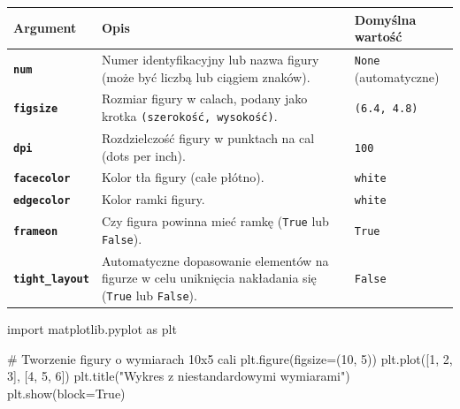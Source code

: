 \documentclass[
  polish,
  letterpaper,
  DIV=11,
  numbers=noendperiod]{scrreprt}
\newenvironment{Shaded}{\begin{snugshade}}{\end{snugshade}}
\newcommand{\CommentTok}[1]{\textcolor[rgb]{0.37,0.37,0.37}{#1}}
\newcommand{\DecValTok}[1]{\textcolor[rgb]{0.68,0.00,0.00}{#1}}
\newcommand{\ImportTok}[1]{\textcolor[rgb]{0.00,0.46,0.62}{#1}}
\newcommand{\NormalTok}[1]{\textcolor[rgb]{0.00,0.23,0.31}{#1}}
\newcommand{\OperatorTok}[1]{\textcolor[rgb]{0.37,0.37,0.37}{#1}}
\newcommand{\StringTok}[1]{\textcolor[rgb]{0.13,0.47,0.30}{#1}}
\newcommand{\VariableTok}[1]{\textcolor[rgb]{0.07,0.07,0.07}{#1}}
\newcounter{none} %
\begin{document}
{\def\LTcaptype{none} %
\begin{longtable}[]{@{}
  >{\raggedright\arraybackslash}p{}
  >{\raggedright\arraybackslash}p{}
  >{\raggedright\arraybackslash}p{}@{}}
\toprule\noalign{}
\begin{minipage}[b]{\linewidth}\raggedright
Argument
\end{minipage} & \begin{minipage}[b]{\linewidth}\raggedright
Opis
\end{minipage} & \begin{minipage}[b]{\linewidth}\raggedright
Domyślna wartość
\end{minipage} \\
\midrule\noalign{}
\endhead
\bottomrule\noalign{}
\endlastfoot
\textbf{\texttt{num}} & Numer identyfikacyjny lub nazwa figury (może być
liczbą lub ciągiem znaków). & \texttt{None} (automatyczne) \\
\textbf{\texttt{figsize}} & Rozmiar figury w calach, podany jako krotka
\texttt{(szerokość,\ wysokość)}. & \texttt{(6.4,\ 4.8)} \\
\textbf{\texttt{dpi}} & Rozdzielczość figury w punktach na cal (dots per
inch). & \texttt{100} \\
\textbf{\texttt{facecolor}} & Kolor tła figury (całe płótno). &
\texttt{white} \\
\textbf{\texttt{edgecolor}} & Kolor ramki figury. & \texttt{white} \\
\textbf{\texttt{frameon}} & Czy figura powinna mieć ramkę (\texttt{True}
lub \texttt{False}). & \texttt{True} \\
\textbf{\texttt{tight\_layout}} & Automatyczne dopasowanie elementów na
figurze w celu uniknięcia nakładania się (\texttt{True} lub
\texttt{False}). & \texttt{False} \\
\end{longtable}
}

\begin{Shaded}
\begin{Highlighting}[]
\ImportTok{import}\NormalTok{ matplotlib.pyplot }\ImportTok{as}\NormalTok{ plt}

\CommentTok{\# Tworzenie figury o wymiarach 10x5 cali}
\NormalTok{plt.figure(figsize}\OperatorTok{=}\NormalTok{(}\DecValTok{10}\NormalTok{, }\DecValTok{5}\NormalTok{))}
\NormalTok{plt.plot([}\DecValTok{1}\NormalTok{, }\DecValTok{2}\NormalTok{, }\DecValTok{3}\NormalTok{], [}\DecValTok{4}\NormalTok{, }\DecValTok{5}\NormalTok{, }\DecValTok{6}\NormalTok{])}
\NormalTok{plt.title(}\StringTok{"Wykres z niestandardowymi wymiarami"}\NormalTok{)}
\NormalTok{plt.show(block}\OperatorTok{=}\VariableTok{True}\NormalTok{)}
\end{Highlighting}
\end{Shaded}
\end{document}
